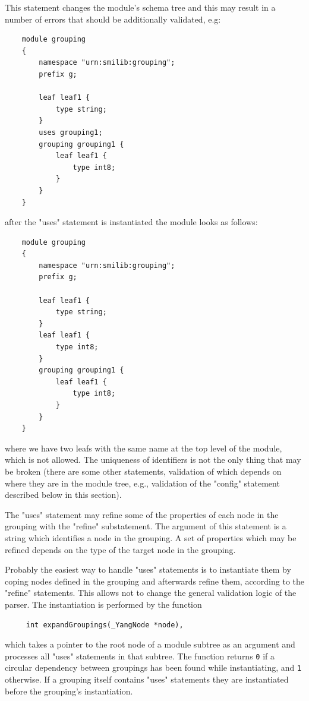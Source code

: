 \documentclass[conference]{IEEEtran}
\begin{document}
This statement changes the module's schema tree and this may result in a number of errors that should be additionally validated, e.g:   
\small
\begin{verbatim}
    module grouping 
    {
        namespace "urn:smilib:grouping";
        prefix g;

        leaf leaf1 {
            type string;
        }
        uses grouping1; 
        grouping grouping1 {
            leaf leaf1 {
                type int8;
            }
        }
    }
\end{verbatim}
\normalsize
after the "uses" statement is instantiated the module looks as follows:
\small
\begin{verbatim}
    module grouping 
    {
        namespace "urn:smilib:grouping";
        prefix g;

        leaf leaf1 {
            type string;
        }
        leaf leaf1 {
            type int8;
        }
        grouping grouping1 {
            leaf leaf1 {
                type int8;
            }
        }		
    }
\end{verbatim}
\normalsize
where we have two leafs with the same name at the top level of the module, which is not allowed. The uniqueness of identifiers is not the only thing that may be 
broken (there are some other statements, validation of which depends on where they are in the module tree, e.g., validation of the "config" statement described below in this section).

The "uses" statement may refine some of the properties of each node in the grouping with the "refine" substatement.  The argument of this statement is a string which
identifies a node in the grouping. A set of properties which may be refined depends on the type of the target node in the grouping.

Probably the easiest way to handle "uses" statements is to instantiate them by coping nodes defined in the grouping and afterwards refine them, according to
the "refine" statements. This allows not to change the general validation logic of the parser. The instantiation is performed by the function
\small
\begin{verbatim}
     int expandGroupings(_YangNode *node),
\end{verbatim}
\normalsize
which takes a pointer to the root node of a module subtree as an argument and processes all "uses" statements in that subtree. 
The function returns \texttt{0} if a circular dependency between groupings has been found while instantiating, and \texttt{1} otherwise.  
If a grouping itself contains "uses" statements they are instantiated before the grouping's instantiation.  
\end{document}
